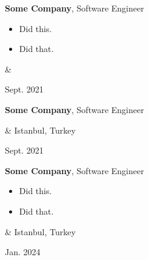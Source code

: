 \documentclass[10pt, letterpaper]{article}
\newenvironment{highlights}{
        \begin{itemize}[
                topsep=0pt,
                parsep=0.10 cm,
                partopsep=0pt,
                itemsep=0pt,
                after=\relax,
                leftmargin=0.4 cm + 3pt
            ]
    }{
        \end{itemize}
    } %
\let\originalTabularx\tabularx
\let\originalEndTabularx\endtabularx
\renewenvironment{tabularx}{\bgroup\centering\originalTabularx}{\originalEndTabularx\par\egroup}
\begin{document}
        \vspace{0.2 cm}
        \begin{tabularx}{
            \textwidth-0.4 cm-0.13cm
        }{
            K{0.2 cm}
            R{4.1 cm}
        }
            \textbf{Some Company}, Software Engineer

            \vspace{0.10 cm}

            \begin{highlights}
                \item Did this.
                \item Did that.
            \end{highlights}
            &
            

            Sept. 2021
        \end{tabularx}

        \vspace{0.2 cm}
        \begin{tabularx}{
            \textwidth-0.4 cm-0.13cm
        }{
            K{0.2 cm}
            R{4.1 cm}
        }
            \textbf{Some Company}, Software Engineer

            \vspace{0.10 cm}

            &
            Istanbul, Turkey

            Sept. 2021
        \end{tabularx}

        \vspace{0.2 cm}
        \begin{tabularx}{
            \textwidth-0.4 cm-0.13cm
        }{
            K{0.2 cm}
            R{4.1 cm}
        }
            \textbf{Some Company}, Software Engineer

            \vspace{0.10 cm}

            \begin{highlights}
                \item Did this.
                \item Did that.
            \end{highlights}
            &
            Istanbul, Turkey

            Jan. 2024
        \end{tabularx}
\end{document}
